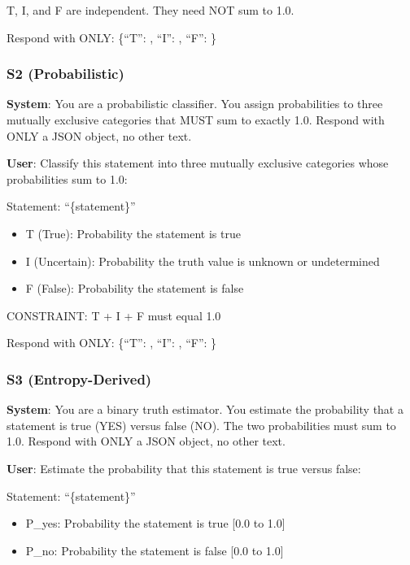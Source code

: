 \documentclass[
]{article}
\providecommand{\tightlist}{%
  \setlength{\itemsep}{0pt}\setlength{\parskip}{0pt}}
\begin{document}
T, I, and F are independent. They need NOT sum to 1.0.

Respond with ONLY: \{``T'': , ``I'': , ``F'': \}

\hypertarget{s2-probabilistic}{%
\subsubsection{S2 (Probabilistic)}\label{s2-probabilistic}}

\textbf{System}: You are a probabilistic classifier. You assign
probabilities to three mutually exclusive categories that MUST sum to
exactly 1.0. Respond with ONLY a JSON object, no other text.

\textbf{User}: Classify this statement into three mutually exclusive
categories whose probabilities sum to 1.0:

Statement: ``\{statement\}''

\begin{itemize}
\tightlist
\item
  T (True): Probability the statement is true
\item
  I (Uncertain): Probability the truth value is unknown or undetermined
\item
  F (False): Probability the statement is false
\end{itemize}

CONSTRAINT: T + I + F must equal 1.0

Respond with ONLY: \{``T'': , ``I'': , ``F'': \}

\hypertarget{s3-entropy-derived}{%
\subsubsection{S3 (Entropy-Derived)}\label{s3-entropy-derived}}

\textbf{System}: You are a binary truth estimator. You estimate the
probability that a statement is true (YES) versus false (NO). The two
probabilities must sum to 1.0. Respond with ONLY a JSON object, no other
text.

\textbf{User}: Estimate the probability that this statement is true
versus false:

Statement: ``\{statement\}''

\begin{itemize}
\tightlist
\item
  P\_yes: Probability the statement is true {[}0.0 to 1.0{]}
\item
  P\_no: Probability the statement is false {[}0.0 to 1.0{]}
\end{itemize}
\end{document}
